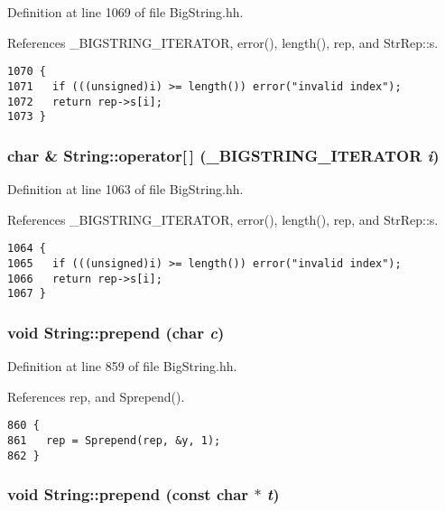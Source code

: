 Definition at line 1069 of file Big\-String.hh.

References \_\-BIGSTRING\_\-ITERATOR, error(), length(), rep, and Str\-Rep::s.



\footnotesize\begin{verbatim}1070 { 
1071   if (((unsigned)i) >= length()) error("invalid index");
1072   return rep->s[i];
1073 }
\end{verbatim}\normalsize 
{}
\subsubsection{\setlength{\rightskip}{0pt plus 5cm}char \& String::operator[$\,$] ({\bf \_\-BIGSTRING\_\-ITERATOR} {\em i})\hspace{0.3cm}{\tt  [inline]}}\label{classString_a98}




Definition at line 1063 of file Big\-String.hh.

References \_\-BIGSTRING\_\-ITERATOR, error(), length(), rep, and Str\-Rep::s.



\footnotesize\begin{verbatim}1064 { 
1065   if (((unsigned)i) >= length()) error("invalid index");
1066   return rep->s[i];
1067 }
\end{verbatim}\normalsize 
{}
\subsubsection{\setlength{\rightskip}{0pt plus 5cm}void String::prepend (char {\em c})\hspace{0.3cm}{\tt  [inline]}}\label{classString_a25}




Definition at line 859 of file Big\-String.hh.

References rep, and Sprepend().



\footnotesize\begin{verbatim}860 {
861   rep = Sprepend(rep, &y, 1); 
862 }
\end{verbatim}\normalsize 
{}
\subsubsection{\setlength{\rightskip}{0pt plus 5cm}void String::prepend (const char $\ast$ {\em t})\hspace{0.3cm}{\tt  [inline]}}\label{classString_a24}




